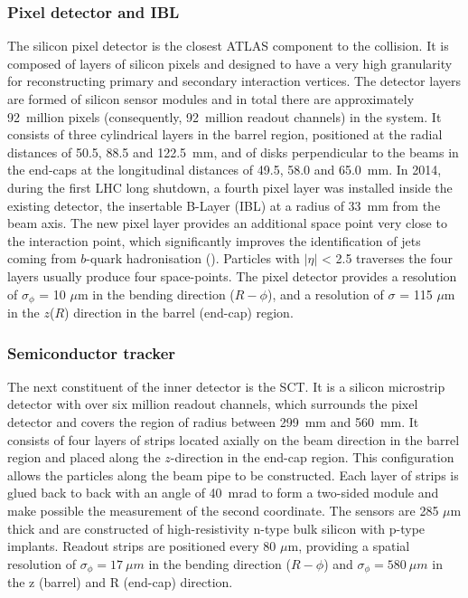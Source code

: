 	\subsubsection{Pixel detector and IBL}
	The silicon pixel detector is the closest ATLAS 
	component to the collision. It is composed of layers of
	silicon pixels and designed to have a very 
	high granularity for reconstructing primary 
	and secondary interaction vertices. 
	The detector layers are formed of silicon sensor modules and 
	in total there are approximately 92~million pixels 
	(consequently, 92~million readout channels) in the system.
	It consists of three cylindrical layers in the 
	barrel region, positioned at the radial distances of 
	50.5, 88.5 and 122.5~mm, 
	and of disks perpendicular to the beams in the end-caps at the
	longitudinal distances of 49.5, 58.0 and 65.0~mm. 
	In 2014, during the first LHC long shutdown, a fourth pixel 
	layer was installed inside the existing detector, 
	the insertable B-Layer (IBL) at a radius of 33~mm 
	from the beam axis.
	The new pixel layer provides an 
	additional space point very close to the interaction point, 
	which significantly improves the identification of jets coming from 
	$b$-quark hadronisation (\bjets). 
	Particles with $|\eta|$ < 2.5 traverses the four layers usually produce  
	four space-points. The pixel detector provides a resolution of 
	$\sigma_\phi$ = 10 $\mu$m in the bending direction ($R - \phi$), 
	and a resolution of $\sigma$ = 115 $\mu$m in the $z$($R$)
	direction in the barrel (end-cap) region.

	\subsubsection{Semiconductor tracker}
	The next constituent of the inner detector is the SCT. 
	It is a silicon microstrip detector with over six million readout channels, 
	which surrounds the pixel detector and covers the region 
	of radius between 299~mm and 560~mm. 
	It consists of four layers of strips located axially on the 
	beam direction in the barrel region and placed along the 
	$z$-direction in the end-cap region. 
	This configuration allows the particles along the beam pipe
	to be constructed. 
	Each layer of strips is glued back to back with an angle of
	40~mrad to form a two-sided module and make possible the 
	measurement of the second coordinate.
	The sensors are 285 $\mu$m thick and are constructed
	of high-resistivity n-type bulk silicon with p-type implants. 
	Readout strips are positioned every 80 $\mu$m, providing a spatial resolution 
	of $\sigma_\phi = 17\ \mu m$ in the bending direction ($R-\phi$)
	and $\sigma_\phi = 580\ \mu m$ in the z (barrel) and R (end-cap) direction. 

